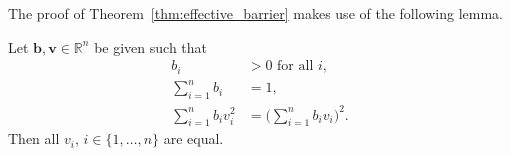 The proof of Theorem~\ref{thm:effective_barrier} makes use of the following 
lemma.
\begin{lemma}\label{Davids_lemma}
	Let $\bm{b},\bm{v} \in \mathbb{R}^{n}$ be given such that
    \begin{subequations}\label{eq:DavidsLemma}
    		\begin{align}
    			b_i & > 0 \mbox{ for all } i, \label{eq:DavidsLemma_a} \\
    			\sum_{i=1}^n b_i & = 1, \label{eq:DavidsLemma_b} \\
    			\sum_{i=1}^n b_i v_i^2 & = \biggl(\sum_{i=1}^n b_i v_i\biggr)^{\!\! 2}. \label{eq:DavidsLemma_c}
    		\end{align}
    	\end{subequations}
    	Then all $v_i$, $i  \in \{1, \dots, n\}$ are equal.
\end{lemma}

